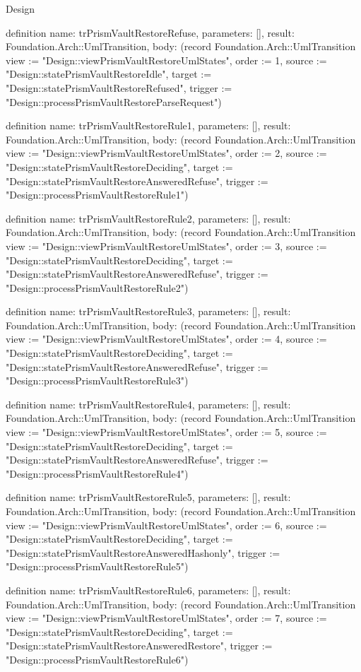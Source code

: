 \begin{lexlean}{Design}
\begin{semanticmodule}
definition{
  name: trPrismVaultRestoreRefuse,
  parameters: [],
  result: Foundation.Arch::UmlTransition,
  body: (record Foundation.Arch::UmlTransition {view := "Design::viewPrismVaultRestoreUmlStates", order := 1, source := "Design::statePrismVaultRestoreIdle", target := "Design::statePrismVaultRestoreRefused", trigger := "Design::processPrismVaultRestoreParseRequest"})
}

definition{
  name: trPrismVaultRestoreRule1,
  parameters: [],
  result: Foundation.Arch::UmlTransition,
  body: (record Foundation.Arch::UmlTransition {view := "Design::viewPrismVaultRestoreUmlStates", order := 2, source := "Design::statePrismVaultRestoreDeciding", target := "Design::statePrismVaultRestoreAnsweredRefuse", trigger := "Design::processPrismVaultRestoreRule1"})
}

definition{
  name: trPrismVaultRestoreRule2,
  parameters: [],
  result: Foundation.Arch::UmlTransition,
  body: (record Foundation.Arch::UmlTransition {view := "Design::viewPrismVaultRestoreUmlStates", order := 3, source := "Design::statePrismVaultRestoreDeciding", target := "Design::statePrismVaultRestoreAnsweredRefuse", trigger := "Design::processPrismVaultRestoreRule2"})
}

definition{
  name: trPrismVaultRestoreRule3,
  parameters: [],
  result: Foundation.Arch::UmlTransition,
  body: (record Foundation.Arch::UmlTransition {view := "Design::viewPrismVaultRestoreUmlStates", order := 4, source := "Design::statePrismVaultRestoreDeciding", target := "Design::statePrismVaultRestoreAnsweredRefuse", trigger := "Design::processPrismVaultRestoreRule3"})
}

definition{
  name: trPrismVaultRestoreRule4,
  parameters: [],
  result: Foundation.Arch::UmlTransition,
  body: (record Foundation.Arch::UmlTransition {view := "Design::viewPrismVaultRestoreUmlStates", order := 5, source := "Design::statePrismVaultRestoreDeciding", target := "Design::statePrismVaultRestoreAnsweredRefuse", trigger := "Design::processPrismVaultRestoreRule4"})
}

definition{
  name: trPrismVaultRestoreRule5,
  parameters: [],
  result: Foundation.Arch::UmlTransition,
  body: (record Foundation.Arch::UmlTransition {view := "Design::viewPrismVaultRestoreUmlStates", order := 6, source := "Design::statePrismVaultRestoreDeciding", target := "Design::statePrismVaultRestoreAnsweredHashonly", trigger := "Design::processPrismVaultRestoreRule5"})
}

definition{
  name: trPrismVaultRestoreRule6,
  parameters: [],
  result: Foundation.Arch::UmlTransition,
  body: (record Foundation.Arch::UmlTransition {view := "Design::viewPrismVaultRestoreUmlStates", order := 7, source := "Design::statePrismVaultRestoreDeciding", target := "Design::statePrismVaultRestoreAnsweredRestore", trigger := "Design::processPrismVaultRestoreRule6"})
}


\end{semanticmodule}
\end{lexlean}
